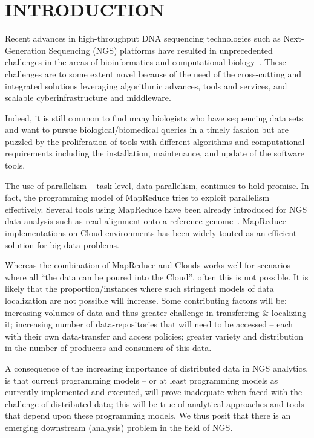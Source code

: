 \documentclass{acm_proc_article-sp}
\begin{document}
\section{INTRODUCTION} 

Recent advances in high-throughput DNA sequencing technologies such as
Next-Generation Sequencing (NGS) platforms have resulted in
unprecedented challenges in the areas of bioinformatics and
computational
biology~\cite{metzker2010,1000genome,wang2009-natrevgen,alex2009,mcpherson2009}.
These challenges are to some extent novel because of the need of the
cross-cutting and integrated solutions leveraging algorithmic
advances, tools and services, and scalable cyberinfrastructure and
middleware.

Indeed, it is still common to find many biologists who have sequencing
data sets and want to pursue biological/biomedical queries in a
timely fashion but are puzzled by the proliferation of tools with
different algorithms and computational requirements including the
installation, maintenance, and update of the software tools.

The use of parallelism -- task-level, data-parallelism, continues to
hold promise. In fact, the programming model of MapReduce tries to
exploit parallelism effectively.  Several tools using MapReduce have
been already introduced for NGS data analysis such as read alignment
onto a reference genome~\cite{cloudburst,
  gatk,langmead2009,seal2011,langmead2010, taylor2010}.  MapReduce
implementations on Cloud environments has been widely touted as an
efficient solution for big data
problems\cite{mapreduce-2004-dean,schatz-nature-biotech-2010,
  taylor2010}.

Whereas the combination of MapReduce and Clouds works well for
scenarios where all ``the data can be poured into the Cloud'', often
this is not possible.  It is likely that the proportion/instances
where such stringent models of data localization are not possible will
increase.  Some contributing factors will be: increasing volumes of
data and thus greater challenge in transferring \& localizing it;
increasing number of data-repositories that will need to be accessed
-- each with their own data-transfer and access policies; greater
variety and distribution in the number of producers and consumers of
this data. 

A consequence of the increasing importance of distributed data in NGS
analytics, is that current programming models -- or at least
programming models as currently implemented and executed, will prove
inadequate when faced with the challenge of distributed data; this
will be true of analytical approaches and tools that depend upon these
programming models. We thus posit that there is an emerging downstream
(analysis) problem in the field of NGS. 
\end{document}
